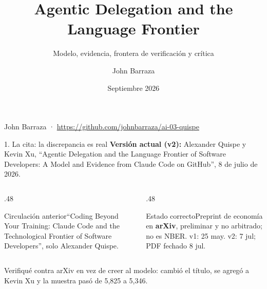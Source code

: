 \documentclass[aspectratio=169,10pt]{beamer}
\title{Agentic Delegation and the Language Frontier}
\subtitle{Modelo, evidencia, frontera de verificación y crítica}
\author{John Barraza}\institute{AI Economic Modelling · Repositorio 03}\date{Septiembre 2026}
\begin{document}
\begin{frame}[plain]
\color{white}\vspace{1.2em}{\Huge\bfseries Agentic Delegation}\par\vspace{.3em}{\Large and the Language Frontier}\par\vspace{1.1em}{\large Quispe \& Xu (2026), arXiv:2605.25438v2}\par\vfill{\small John Barraza · \url{https://github.com/johnbarraza/ai-03-quispe}}
\end{frame}

\begin{frame}{1. La cita: la discrepancia es real}
\textbf{Versión actual (v2):} Alexander Quispe y Kevin Xu, ``Agentic Delegation and the Language Frontier of Software Developers: A Model and Evidence from Claude Code on GitHub'', 8 de julio de 2026.
\vspace{.8em}
\begin{columns}[T,onlytextwidth]
\begin{column}{.48\textwidth}\begin{block}{Circulación anterior}``Coding Beyond Your Training: Claude Code and the Technological Frontier of Software Developers'', solo Alexander Quispe.\end{block}\end{column}
\begin{column}{.48\textwidth}\begin{alertblock}{Estado correcto}Preprint de economía en \textbf{arXiv}, preliminar y no arbitrado; no es NBER. v1: 25 may. v2: 7 jul; PDF fechado 8 jul.\end{alertblock}\end{column}
\end{columns}
\vspace{.6em}
\small Verifiqué contra arXiv en vez de creer al modelo: cambió el título, se agregó a Kevin Xu y la muestra pasó de 5,825 a 5,346.
\end{frame}
\end{document}
